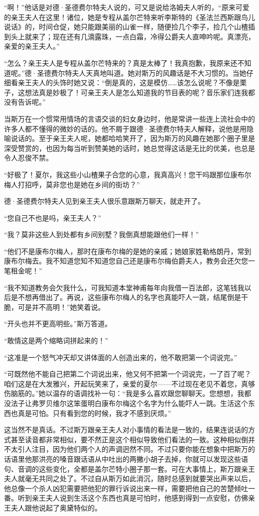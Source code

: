 \par “啊！”他话是对德·圣德费尔特夫人说的，可又是说给洛姆夫人听的，“原来可爱的亲王夫人在这里！诸位，她是专程从盖尔芒特来听李斯特的《圣法兰西斯跟鸟儿说话》的，时间仓促，她只能跟美丽的山雀一样，随便捡几个李子，捡几个山楂插到头上就来了；现在还有几滴露珠，一点白霜，冷得公爵夫人直呻吟呢。真漂亮，亲爱的亲王夫人。”
\par “怎么？亲王夫人是专程从盖尔芒特来的？真是太棒了！我真抱歉，我原来还不知道呢。”德·圣德费尔特夫人天真地叫道。她对斯万的风趣话是不大习惯的。当她仔细看亲王夫人的头饰时她又说：“倒是真的，这是模仿……该怎么说呢？不像是栗子，这想法真是妙极了！可亲王夫人是怎么知道我的节目表的呢？音乐家们连我都没有告诉呢。”
\par 当斯万在一个惯常用情场的言语交谈的妇女身边时，他是常讲一些连上流社会中的许多人都不懂得的微妙的话的。他不屑于跟德·圣德费尔特夫人解释，说他是用隐喻说话的。至于亲王夫人呢，她都哈哈笑开了，因为斯万的风趣在她那个圈子里是深受赞赏的，也因为每当听到赞美她的话时，她总觉得这话是无比的优美，也总是令人忍俊不禁。
\par “好极了！夏尔，我这些小山楂果子合您的心意，我真高兴！您干吗跟那位康布尔梅人打招呼，莫非您也是她在乡间的街坊？”
\par 德·圣德费尔特夫人见到亲王夫人很乐意跟斯万聊天，就走开了。
\par “您自己不也是吗，亲王夫人？”
\par “我？莫非这些人到处都有乡间别墅？我倒真想能跟他们一样！”
\par “他们不是康布尔梅人，那时在康布尔梅的是她的亲戚；她娘家姓勒格朗丹，常到康布尔梅去。我不知道您知不知道您自己还是康布尔梅伯爵夫人，教务会还欠您一笔租金呢！”
\par “我不知道教务会欠我什么，可我知道本堂神甫每年向我借一百法郎，这笔钱我以后是不想再借出了。再说，这些康布尔梅人的名字也真能吓人一跳，结尾倒是干脆，可是并不高明！”她笑着说。
\par “开头也并不更高明些。”斯万答道。
\par “敢情这是两个缩略词拼起来的！”
\par “这准是一个怒气冲天却又讲体面的人创造出来的，他不敢把第一个词说完。”
\par “可既然他不能自己把第二个词说出来，他又何不把第一个词说完，一了百了呢？咱们这是在大发雅兴，开起玩笑来了，亲爱的夏尔——不过现在老见不着您，真够伤脑筋的。”她以温存的语调找补一句：“我是多么喜欢跟您聊聊天。您想想，我都没法子让弗罗贝维尔这笨蛋明白康布尔梅这个名字为什么能吓人一跳。生活这个东西也真是可怕。只有看到您的时候，我才不感到厌烦。”
\par 这当然不是真话。不过斯万跟亲王夫人对小事情的看法是一致的，结果连说话的方式甚至读音都非常相似，要不然正是这个相似导致他们看法的一致。这种相似倒并不太引人注目，因为他们两个人的声调迥然不同。不过只要你能在想象中把斯万的话语里他那洪亮的嗓音跟话语从中吐出的两撇小胡子去掉，你就可以发现这些语句、音调的这些变化，全都是盖尔芒特小圈子那一套。可在大事情上，斯万跟亲王夫人就毫无共同之处了。不过自从斯万如此消沉，随时总感到就要哭出声来以后，他总像一个杀人凶犯需要把他犯的罪行诉说出来一样，需要把他自己的苦楚倾吐一番。听到亲王夫人说到生活这个东西也真是可怕时，他感到得到一点安慰，仿佛亲王夫人跟他说起了奥黛特似的。
